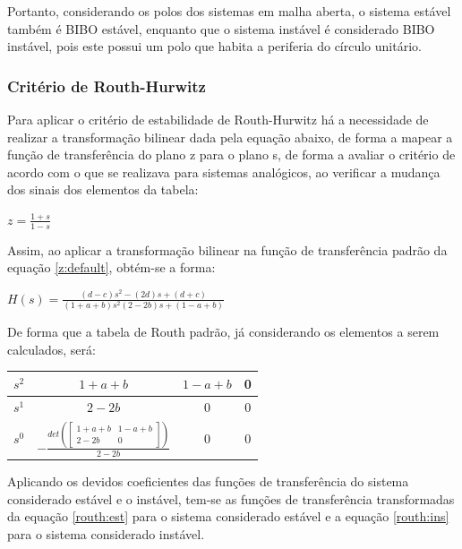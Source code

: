 Portanto, considerando os polos dos sistemas em malha aberta, o sistema estável também é BIBO estável, enquanto que o sistema instável é considerado BIBO instável, pois este possui um polo que habita a periferia do círculo unitário. 

\subsubsection{Critério de Routh-Hurwitz}

Para aplicar o critério de estabilidade de Routh-Hurwitz há a necessidade de realizar a transformação bilinear dada pela equação abaixo, de forma a mapear a função de transferência do plano z para o plano s, de forma a avaliar o critério de acordo com o que se realizava para sistemas analógicos, ao verificar a mudança dos sinais dos elementos da tabela:

\begin{center}
    $z = \frac{1+s}{1-s}$
\end{center}

Assim, ao aplicar a transformação bilinear na função de transferência padrão da equação \ref{z:default}, obtém-se a forma:

\begin{center}
    $H(s) = \frac{(d-c)s^2 - (2d)s + (d+c)}{(1+a+b)s^2 (2-2b)s + (1-a+b)}$
\end{center}

De forma que a tabela de Routh padrão, já considerando os elementos a serem calculados, será:

\begin{table}[h]
\centering
\begin{tabular}{l|ccc}
 $s^2$ & $1+a+b$ & $1-a+b$ & 0 \\ \hline
 $s^1$ & $2-2b$ & 0 & 0 \\ \hline
 $s^0$ & $-\frac{det\left(\begin{bmatrix} 1+a+b & 1-a+b \\ 2-2b & 0 \end{bmatrix}\right)}{2-2b}$ & 0 & 0 \\ \hline
\end{tabular}
\end{table}

Aplicando os devidos coeficientes das funções de transferência do sistema considerado estável e o instável, tem-se as funções de transferência transformadas da equação \ref{routh:est} para o sistema considerado estável e a equação \ref{routh:ins} para o sistema considerado instável.

